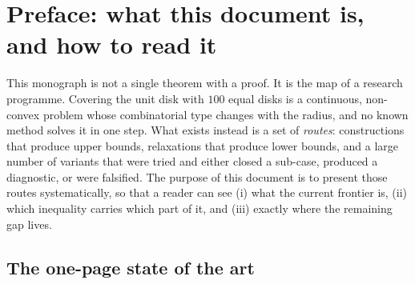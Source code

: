 \section*{Preface: what this document is, and how to read it}

This monograph is not a single theorem with a proof. It is the map of a research programme.
Covering the unit disk with $100$ equal disks is a continuous, non-convex problem whose
combinatorial type changes with the radius, and no known method solves it in one step. What exists
instead is a set of \emph{routes}: constructions that produce upper bounds, relaxations that produce
lower bounds, and a large number of variants that were tried and either closed a sub-case, produced
a diagnostic, or were falsified. The purpose of this document is to present those routes
systematically, so that a reader can see (i) what the current frontier is, (ii) which inequality
carries which part of it, and (iii) exactly where the remaining gap lives.

\subsection*{The one-page state of the art}

